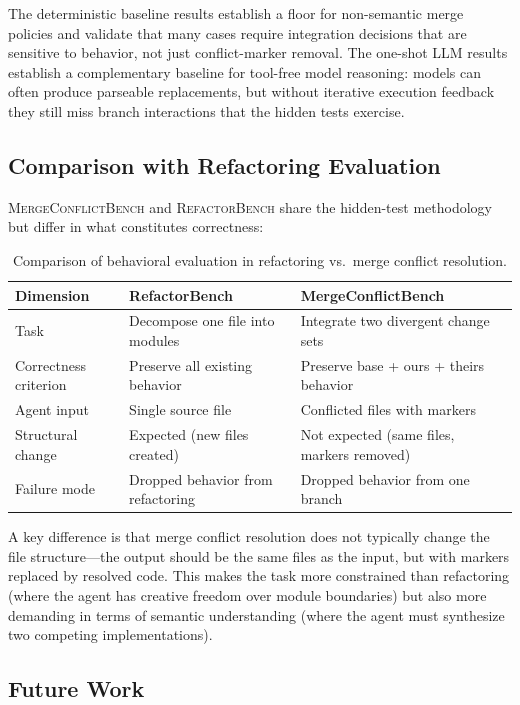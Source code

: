 \documentclass[11pt,letterpaper]{article}
\begin{document}
The deterministic baseline results establish a floor for non-semantic merge policies and validate that many cases require integration decisions that are sensitive to behavior, not just conflict-marker removal. The one-shot LLM results establish a complementary baseline for tool-free model reasoning: models can often produce parseable replacements, but without iterative execution feedback they still miss branch interactions that the hidden tests exercise.

\subsection{Comparison with Refactoring Evaluation}

\textsc{MergeConflictBench} and \textsc{RefactorBench} share the hidden-test methodology but differ in what constitutes correctness:

\begin{table}[ht]
\centering
\caption{Comparison of behavioral evaluation in refactoring vs.\ merge conflict resolution.}
\label{tab:comparison}
\small
\begin{tabularx}{\textwidth}{lXX}
\toprule
\textbf{Dimension} & \textbf{RefactorBench} & \textbf{MergeConflictBench} \\
\midrule
Task & Decompose one file into modules & Integrate two divergent change sets \\
Correctness criterion & Preserve all existing behavior & Preserve base + ours + theirs behavior \\
Agent input & Single source file & Conflicted files with markers \\
Structural change & Expected (new files created) & Not expected (same files, markers removed) \\
Failure mode & Dropped behavior from refactoring & Dropped behavior from one branch \\
\bottomrule
\end{tabularx}
\end{table}

A key difference is that merge conflict resolution does not typically change the file structure---the output should be the same files as the input, but with markers replaced by resolved code. This makes the task more constrained than refactoring (where the agent has creative freedom over module boundaries) but also more demanding in terms of semantic understanding (where the agent must synthesize two competing implementations).

\subsection{Future Work}
\end{document}
